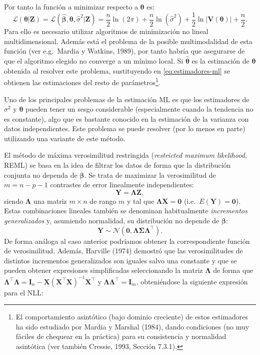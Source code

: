 \documentclass[
]{book}
\theoremstyle{break}
\theoremstyle{definition}
\theoremstyle{definition}
\theoremstyle{definition}
\theoremstyle{definition}
\theoremstyle{remark}
\begin{document}
Por tanto la función a minimizar respecto a \(\boldsymbol{\theta}\) es:
\[\mathcal{L}(\boldsymbol{\theta}\left| \mathbf{Z}\right. )=\mathcal{L}(\hat{\boldsymbol{\beta}} ,\boldsymbol{\theta},\hat{\sigma }^2 \left|
\mathbf{Z}\right. ) = \dfrac{n}{2} \ln (2\pi ) + \dfrac{n}{2} \ln (\hat{\sigma
}^2) + \dfrac{1}{2} \ln \left| \mathbf{V}(\boldsymbol{\theta})\right| +\dfrac{n}{2}.\]
Para ello es necesario utilizar algoritmos de minimización no lineal multidimensional.
Además está el problema de la posible multimodalidad de esta función (ver e.g.~Mardia y Watkins, 1989), por tanto habría que asegurarse de que el algoritmo elegido no converge a un mínimo local.
Si \(\hat{\boldsymbol{\theta}}\) es la estimación de \(\boldsymbol{\theta}\) obtenida al resolver este problema, sustituyendo en \eqref{eq:estimadores-ml} se obtienen las estimaciones del resto de parámetros\footnote{El comportamiento asintótico (bajo dominio creciente) de estos estimadores ha sido estudiado por Mardia y Marshal (1984), dando condiciones (no muy fáciles de chequear en la práctica) para su consistencia y normalidad asintótica (ver también Cressie, 1993, Sección 7.3.1).}.

Uno de los principales problemas de la estimación ML es que los estimadores de \(\sigma^2\) y \(\boldsymbol{\theta}\) pueden tener un sesgo considerable (especialmente cuando la tendencia no es constante), algo que es bastante conocido en la estimación de la varianza con datos independientes.
Este problema se puede resolver (por lo menos en parte) utilizando una variante de este método.

El método de máxima verosimilitud restringida (\emph{restricted maximum likelihood}, REML) se basa en la idea de filtrar los datos de forma que la distribución conjunta no dependa de \(\boldsymbol{\beta}\).
Se trata de maximizar la verosimilitud de \(m=n-p-1\) contrastes de error linealmente independientes:
\[\mathbf{Y}=\boldsymbol{\Lambda}\mathbf{Z},\]
siendo \(\boldsymbol{\Lambda}\) una matriz \(m\times n\) de rango \(m\) y tal que \(\boldsymbol{\Lambda}\mathbf{X}=\mathbf{0}\) (i.e.~\(E(\mathbf{Y}) = \mathbf{0}\)).
Estas combinaciones lineales también se denominan habitualmente \emph{incrementos generalizados} y, asumiendo normalidad, su distribución no depende de \(\boldsymbol{\beta}\):
\[\mathbf{Y}\sim \mathcal{N}(\mathbf{0},\boldsymbol{\Lambda}\boldsymbol{\Sigma}\boldsymbol{\Lambda}^\top).\]
De forma análoga al caso anterior podríamos obtener la correspondiente función de verosimilitud. Además, Harville (1974) demostró que las verosimilitudes de distintos incrementos generalizados son iguales salvo una constante y que se pueden obtener expresiones simplificadas
seleccionando la matriz \(\boldsymbol{\Lambda}\) de forma que \(\boldsymbol{\Lambda}^\top \boldsymbol{\Lambda}=\mathbf{I}_{n} -\mathbf{X}(\mathbf{X^\top}\mathbf{X})^{-1} \mathbf{X}^\top\) y \(\boldsymbol{\Lambda}\boldsymbol{\Lambda}^\top =\mathbf{I}_{m}\), obteniéndose la siguiente expresión para el NLL:
\end{document}

